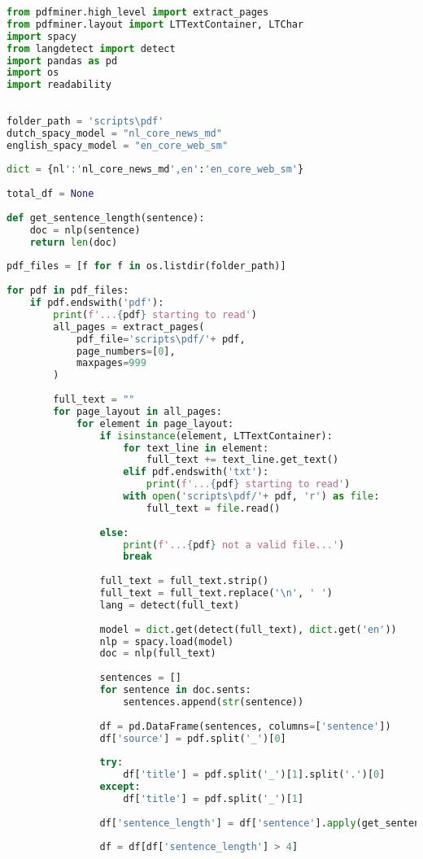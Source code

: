 \newpage

\begin{center}
	\begin{lstlisting}[language=Python, caption={Script voor text-analyse met Readability}, label={code:script-for-text-analysis}]
from pdfminer.high_level import extract_pages
from pdfminer.layout import LTTextContainer, LTChar
import spacy
from langdetect import detect
import pandas as pd
import os
import readability
		
		
folder_path = 'scripts\pdf'
dutch_spacy_model = "nl_core_news_md"
english_spacy_model = "en_core_web_sm"
		
dict = {nl':'nl_core_news_md',en':'en_core_web_sm'}
		
total_df = None
		
def get_sentence_length(sentence):
	doc = nlp(sentence)
	return len(doc)
		
pdf_files = [f for f in os.listdir(folder_path)]
		
for pdf in pdf_files:
	if pdf.endswith('pdf'):
		print(f'...{pdf} starting to read')
		all_pages = extract_pages(
			pdf_file='scripts\pdf/'+ pdf,
			page_numbers=[0],
			maxpages=999
		)
		
		full_text = ""
		for page_layout in all_pages:
			for element in page_layout:
				if isinstance(element, LTTextContainer):		
					for text_line in element:
						full_text += text_line.get_text()
					elif pdf.endswith('txt'):
						print(f'...{pdf} starting to read')
					with open('scripts\pdf/'+ pdf, 'r') as file:
						full_text = file.read()
		
				else:
					print(f'...{pdf} not a valid file...')
					break
		
				full_text = full_text.strip()
				full_text = full_text.replace('\n', ' ')
				lang = detect(full_text)
		
				model = dict.get(detect(full_text), dict.get('en'))
				nlp = spacy.load(model)
				doc = nlp(full_text)
		
				sentences = []
				for sentence in doc.sents:
					sentences.append(str(sentence))
		
				df = pd.DataFrame(sentences, columns=['sentence'])
				df['source'] = pdf.split('_')[0]
		
				try:
					df['title'] = pdf.split('_')[1].split('.')[0]
				except:
					df['title'] = pdf.split('_')[1]
		
				df['sentence_length'] = df['sentence'].apply(get_sentence_length)
		
				df = df[df['sentence_length'] > 4]   
		

\end{lstlisting}
\end{center}

